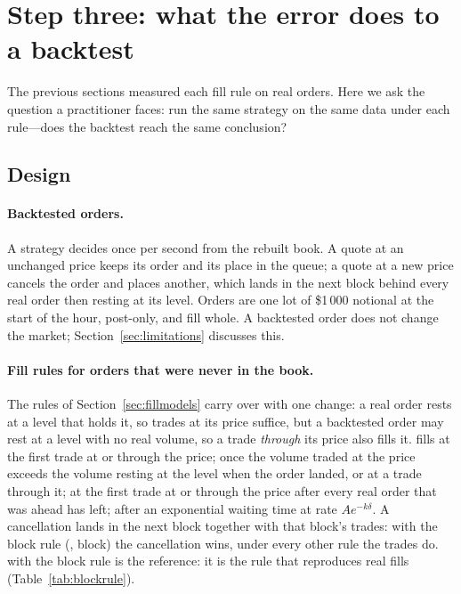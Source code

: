 \section{Step three: what the error does to a backtest}
\label{sec:backtest}

The previous sections measured each fill rule on real orders. Here we ask the
question a practitioner faces: run the same strategy on the same data under each
rule---does the backtest reach the same conclusion?

\subsection{Design}

\paragraph{Backtested orders.}
A strategy decides once per second from the rebuilt book. A quote at an unchanged
price keeps its order and its place in the queue; a quote at a new price cancels
the order and places another, which lands in the next block behind every real
order then resting at its level. Orders are one lot of \$1\,000 notional at the
start of the hour, post-only, and fill whole. A backtested order does not change
the market; Section~\ref{sec:limitations} discusses this.

\paragraph{Fill rules for orders that were never in the book.}
The rules of Section~\ref{sec:fillmodels} carry over with one change: a real order
rests at a level that holds it, so trades at its price suffice, but a backtested
order may rest at a level with no real volume, so a trade \emph{through} its
price also fills it. \touch{} fills at the first trade at or through the price;
\vt{} once the volume traded at the price exceeds the volume resting at the level
when the order landed, or at a trade through it; \qa{} at the first trade at or
through the price after every real order that was ahead has left; \clock{} after
an exponential waiting time at rate $A e^{-k\delta}$. A cancellation lands in the
next block together with that block's trades: with the block rule
(\qa, block) the cancellation wins, under every other rule the trades do.
\qa{} with the block rule is the reference: it is the rule that reproduces real
fills (Table~\ref{tab:blockrule}).

